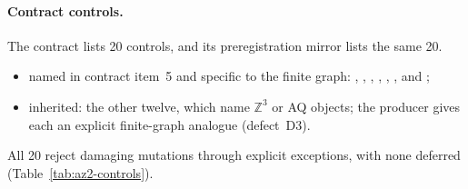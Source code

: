 \paragraph{Contract controls.}
The contract lists 20 controls, and its preregistration mirror lists the same
20.
\begin{itemize}\raggedright
\item named in contract item~5 and specific to the finite graph:
 , ,
 ,
 , ,
 ,  and
 ;
\item inherited: the other twelve, which name $\mathbb Z^3$ or AQ objects;
 the producer gives each an explicit finite-graph analogue (defect~D3).
\end{itemize} All 20 reject damaging mutations through
explicit exceptions, with none deferred (Table~\ref{tab:az2-controls}).

